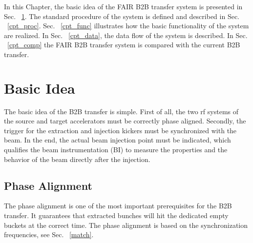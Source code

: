 

In this Chapter, the basic idea of the FAIR B2B transfer system is presented in Sec. ~\ref{cpt_idea}. The standard procedure of the system is defined and described in Sec. ~\ref{cpt_proc}. Sec.  ~\ref{cpt_func} illustrates how the basic functionality of the system are realized. In Sec.  ~\ref{cpt_data}, the data flow of the system is described. In Sec.  ~\ref{cpt_comp} the FAIR B2B transfer system is compared with the current B2B transfer. 

\section{Basic Idea} 
\label{cpt_idea}
The basic idea of the B2B transfer is simple. First of all, the two rf systems of the source and target accelerators must be correctly phase aligned. Secondly, the trigger for the extraction and injection kickers must be synchronized with the beam. In the end, the actual beam injection point must be indicated, which qualifies the beam instrumentation (\gls{BI}) to measure the properties and the behavior of the beam directly after the injection. 



\subsection{Phase Alignment}
The phase alignment is one of the most important prerequisites for the B2B transfer. It guarantees that extracted bunches will hit the dedicated empty buckets at the correct time. The phase alignment is based on the synchronization frequencies, see Sec. ~\ref{match}. 

